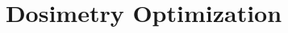 \documentclass{article}
\title{Dosimetry Optimization}
\date{}
\begin{document}
	\maketitle
	\begin{abstract}
		
	\end{abstract}
	\setcounter{tocdepth}{5}
	\tableofcontents
	
	
	
	
	
\end{document}
